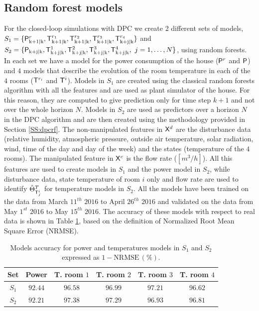 \subsection{Random forest models} For the closed-loop simulations with DPC we create $2$ different sets of models, $S_1 = \{\mathsf{P}^{r}_{\mathrm{k+1|k}},\mathsf{T}^{r_1}_{\mathrm{k+1|k}},\mathsf{T}^{r_2}_{\mathrm{k+1|k}},\mathsf{T}^{r_3}_{\mathrm{k+1|k}},\mathsf{T}^{r_4}_{\mathrm{k+j|k}}\}$ and $S_2 = \{\tP_{\mathrm{k+j|k}},\tT^{1}_{\mathrm{k+j|k}},\tT^{2}_{\mathrm{k+j|k}},\tT^{3}_{\mathrm{k+j|k}},\\\tT^{4}_{\mathrm{k+j|k}},\ j = 1,\ldots,N\}$, using random forests. In each set we have a model for the power consumption of the house ($\mathsf{P}^{r}$ and $\mathsf{P}$) and $4$ models that describe the evolution of the room temperature in each of the $4$ rooms ($\mathsf{T}^{r_i}$ and $\mathsf{T}^i$). Models in $S_1$ are created using the classical random forests algorithm with all the features and are used as plant simulator of the house. For this reason, they are computed to give prediction only for time step $k+1$ and not over the whole horizon $N$. Models in $S_2$ are used as predictors over a horizon $N$ in the DPC algorithm and are then created using the methodology provided in Section \ref{SS:dpcrf}. The non-manipulated features in $\mathsf{X}^d$ are the disturbance data (relative humidity, atmospheric pressure, outside air temperature, solar radiation, wind, time of the day and day of the week) and the states (temperature of the $4$ rooms). The manipulated feature in $\mathsf{X}^c$ is the flow rate ($[m^3/h]$). All this features are used to create models in $S_1$ and the power model in $S_2$, while disturbance data, state temperature of room $i$ only and flow rate are used to identify $\hat{\Theta}^{T}_{\mathsf{T}^i_j}$ for temperature models in $S_2$. All the models have been trained on the data from March $11^{th}$ $2016$ to April $26^{th}$ $2016$ and validated on the data from May $1^{st}$ $2016$ to May $15^{th}$ $2016$. The accuracy of these models with respect to real data is shown in Table \ref{T:S1accuracy}, based on the definition of Normalized Root Mean Square Error (NRMSE).

\begin{table}[h!]
	\centering
	\begin{tabular}{cccccc}
		\toprule
		Set       & Power   & T. room $1$ & T. room $2$ & T. room $3$ & T. room $4$  \\ 
		\midrule
		$S_1$     & $92.44$ & $96.58$     & $96.99$     & $97.21$     & $96.62$\\
		$S_2$     & $92.21$ & $97.38$     & $97.29$     & $96.93$     & $96.81$\\
		\bottomrule
	\end{tabular}
	\caption{Models accuracy for power and temperatures models in $S_1$ and $S_2$ expressed as $\mathrm{1-NRMSE}\,(\%)$.}
	\captionsetup{justification=centering}
	\label{T:S1accuracy}
\end{table}

